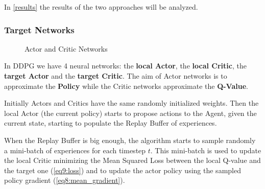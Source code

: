 \documentclass[a4paper, 11pt]{article}
\begin{document}
	In \vref{results} the results of the two approaches will be analyzed.
	
	\subsubsection{Target Networks} 
	\begin{figure}[!h]
		\begin{center}
		\end{center}		
		\caption{Actor and Critic Networks}
		\label{fig:actor_critic}
	\end{figure}
	In DDPG we have 4 neural networks: the \textbf{local Actor}, the \textbf{local Critic}, the \textbf{target Actor} and the \textbf{target Critic}. The aim of Actor networks is to approximate the \textbf{Policy} while the Critic networks approximate the \textbf{Q-Value}.
	
	Initially Actors and Critics have the same randomly initialized weights. Then the local Actor (the current policy) starts to propose actions to the Agent, given the current state, starting to populate the Replay Buffer of experiences.
	
	When the Replay Buffer is big enough, the algorithm starts to sample randomly a mini-batch of experiences for each timestep $t$. This mini-batch is used to update the local Critic minimizing the Mean Squared Loss between the local Q-value and the target one (\vref{eq9:loss}) and to update the actor policy using the sampled policy gradient (\vref{eq8:mean_gradient}).
	
\end{document}
